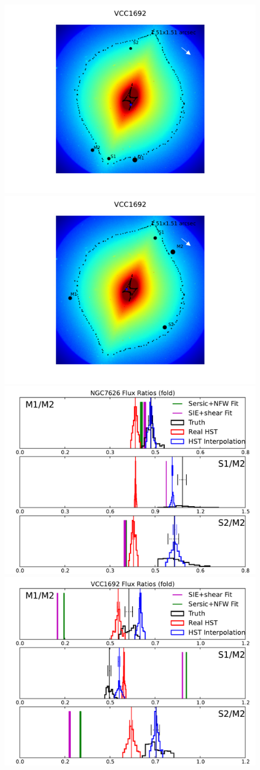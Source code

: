 \begin{figure}
	\includegraphics[trim=3cm 0cm 3cm 0cm,clip,width=.24\textwidth]{./figures_sls/kappamap_VCC1692_cusp_withshear-eps-converted-to.pdf}
	\includegraphics[trim=3cm 0cm 3cm 0cm,clip,width=.24\textwidth]{./figures_sls/kappamap_VCC1692_fold_withshear-eps-converted-to.pdf}
	\includegraphics[clip,trim=.85cm 0cm .1cm
	0cm,width=0.48\linewidth,keepaspectratio]{./figures_sls/NGC7626_fold_fluxratios-eps-converted-to.pdf}
	\includegraphics[clip,trim=.9cm 0cm .2cm
	0cm,width=0.48\linewidth,keepaspectratio]{./figures_sls/VCC1692_fold_fluxratios-eps-converted-to.pdf}

\end{figure}
